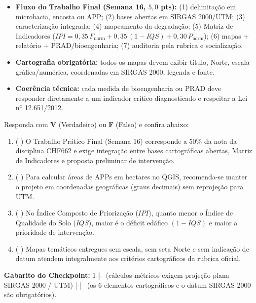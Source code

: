 \begin{boxResumo}
\begin{itemize}[leftmargin=1.4em, itemsep=2.5pt]
  \item \textbf{Fluxo do Trabalho Final (Semana 16, $5{,}0$ pts):} (1) delimitação em microbacia, encosta ou APP; (2) bases abertas em SIRGAS 2000/UTM; (3) caracterização integrada; (4) mapeamento da degradação; (5) Matriz de Indicadores ($IPI = 0{,}35\,F_{\text{norm}} + 0{,}35\,(1-IQS) + 0{,}30\,P_{\text{norm}}$); (6) mapas + relatório + PRAD/bioengenharia; (7) auditoria pela rubrica e socialização.
  \item \textbf{Cartografia obrigatória:} todos os mapas devem exibir título, Norte, escala gráfica/numérica, coordenadas em SIRGAS 2000, legenda e fonte.
  \item \textbf{Coerência técnica:} cada medida de bioengenharia ou PRAD deve responder diretamente a um indicador crítico diagnosticado e respeitar a Lei nº 12.651/2012.
\end{itemize}
\end{boxResumo}

\begin{boxTeste}
Responda com \textbf{V} (Verdadeiro) ou \textbf{F} (Falso) e confira abaixo:
\begin{enumerate}[leftmargin=1.6em, itemsep=3pt]
  \item ( \quad ) O Trabalho Prático Final (Semana 16) corresponde a $50\%$ da nota da disciplina CHF662 e exige integração entre bases cartográficas abertas, Matriz de Indicadores e proposta preliminar de intervenção.
  \item ( \quad ) Para calcular áreas de APPs em hectares no QGIS, recomenda-se manter o projeto em coordenadas geográficas (graus decimais) sem reprojeção para UTM.
  \item ( \quad ) No Índice Composto de Priorização ($IPI$), quanto menor o Índice de Qualidade do Solo ($IQS$), maior é o déficit edáfico $(1 - IQS)$ e maior a prioridade de intervenção.
  \item ( \quad ) Mapas temáticos entregues sem escala, sem seta Norte e sem indicação de datum atendem integralmente aos critérios cartográficos da rubrica oficial.
\end{enumerate}
\vspace{4pt}
{\footnotesize\textbf{Gabarito do Checkpoint:} 1-\V \quad|-\F\ (cálculos métricos exigem projeção plana SIRGAS 2000 / UTM) \quad|-\V \quad|-\F\ (os 6 elementos cartográficos e o datum SIRGAS 2000 são obrigatórios).}
\end{boxTeste}
